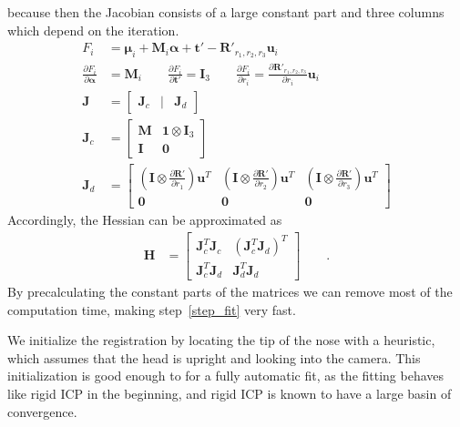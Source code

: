 \documentclass[10pt,twocolumn,letterpaper]{article}
\newcommand*{\dd}{\partial}
\newcommand*{\diffp}[2]{\ensuremath{\frac{\dd #1}{\dd #2}}}
\newcommand{\Matrix}[1]{\begin{bmatrix} #1 \end{bmatrix}}
\newcommand*{\MAT}[1]  {\ensuremath{\mathbf{#1}}}
\newcommand*{\VEC}[1]  {\ensuremath{\bm{#1}}}
\begin{document}
because then the Jacobian consists of a large constant part and three columns
which depend on the iteration.
\begin{align}
  F_i &= \VEC\mu_i + \MAT M_i\VEC\alpha + {\VEC t'} - {\MAT R'_{r_1,r_2,r_3}}\VEC u_i\\
  \diffp{F_i}{\VEC\alpha} &= \MAT M_i\qquad
  \diffp{F_i}{\VEC t'} = \MAT I_3\qquad
  \diffp{F_i}{r_i} = \diffp{\MAT R'_{r_1,r_2,r_3}}{r_i}\VEC u_i\\
  \MAT J &= \Matrix{\MAT J_c & | & \MAT J_d }\\
  \MAT J_c &= \Matrix{\MAT M & \VEC 1 \otimes \MAT I_3\\ \MAT I & \MAT 0}\\
  \MAT J_d &= \Matrix{(\MAT I \otimes \diffp{\MAT R'}{r_1})\MAT u^T & (\MAT I \otimes \diffp{\MAT R'}{r_2})\MAT u^T& (\MAT I \otimes \diffp{\MAT R'}{r_3})\MAT u^T\\\MAT 0 & \MAT 0 & \MAT 0}
\end{align}
Accordingly, the Hessian can be approximated as
\begin{align}
  \MAT H &= \Matrix{
    \MAT J_c^T\MAT J_c & (\MAT J_c^T\MAT J_d)^T\\
    \MAT J_c^T\MAT J_d & \MAT J_d^T\MAT J_d
  }\qquad.
\end{align}
By precalculating the constant parts of the matrices we can remove most of the
computation time, making step~\ref{step_fit} very fast.

We initialize the registration by locating the tip of the nose with a
heuristic, which assumes that the head is upright and looking into the camera.
This initialization is good enough to for a fully automatic
fit, as the fitting behaves like rigid ICP in the beginning, and rigid ICP is
known to have a large basin of convergence.
\end{document}
